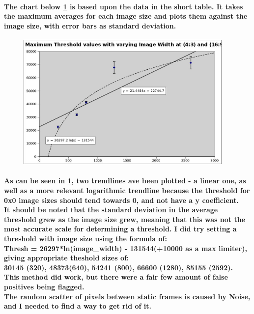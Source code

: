\documentclass[11pt]{article} %
\begin{document}
\paragraph{The chart below \cref{chart:thresholds} is based upon the data in the short table. It takes the maximum averages for each image size and plots them against the image size, with error bars as standard deviation.}
\begin{figure}
	\vspace{-20pt}
	\begin{center}
		\includegraphics[width=0.95\textwidth]{../images/chart-threshold-with-varying-image}
		\label{chart:thresholds}
	\end{center}
\end{figure}
\paragraph{As can be seen in \cref{chart:thresholds}, two trendlines ave been plotted - a linear one, as well as a more relevant logarithmic trendline because the threshold for 0x0 image sizes should tend towards 0, and not have a y coefficient.\\
It should be noted that the standard deviation in the average threshold grew as the image size grew, meaning that this was not the most accurate scale for determining a threshold. I did try setting a threshold with image size using the formula of:\\
 Thresh = 26297*ln(image\_width) - 131544(+10000 as a max limiter),  giving appropriate theshold sizes of:\\
30145 (320), 48373(640), 54241 (800), 66600 (1280), 85155 (2592).\\
This method did work, but there were a fair few amount of false positives being flagged.
\\The random scatter of pixels between static frames is caused by Noise, and I needed to find a way to get rid of it.
}
\end{document}
